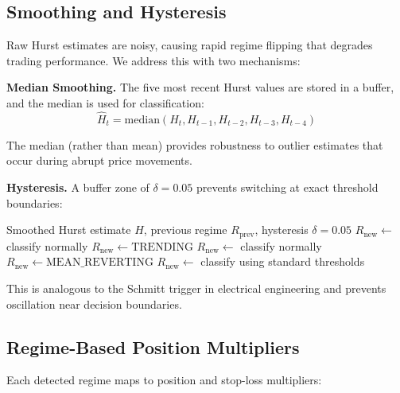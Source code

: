 \documentclass[12pt,a4paper]{article}
\begin{document}
\subsection{Smoothing and Hysteresis}
\label{sec:regime:hysteresis}

Raw Hurst estimates are noisy, causing rapid regime flipping that degrades trading performance. We address this with two mechanisms:

\textbf{Median Smoothing.} The five most recent Hurst values are stored in a buffer, and the median is used for classification:
\begin{equation}
    \hat{H}_t = \text{median}(H_{t}, H_{t-1}, H_{t-2}, H_{t-3}, H_{t-4})
\end{equation}

The median (rather than mean) provides robustness to outlier estimates that occur during abrupt price movements.

\textbf{Hysteresis.} A buffer zone of $\delta = 0.05$ prevents switching at exact threshold boundaries:

\begin{algorithm}[h!]
\caption{Hurst Regime Detection with Hysteresis}
\label{alg:hysteresis}
\begin{algorithmic}[1]
\Require Smoothed Hurst estimate $\hat{H}$, previous regime $R_{\text{prev}}$, hysteresis $\delta = 0.05$
     
        \State $R_{\text{new}} \gets$ classify normally
    \Else
        \State $R_{\text{new}} \gets \text{TRENDING}$
    \EndIf
{}
     
        \State $R_{\text{new}} \gets$ classify normally
    \Else
        \State $R_{\text{new}} \gets \text{MEAN\_REVERTING}$
    \EndIf
\Else
    \State $R_{\text{new}} \gets$ classify using standard thresholds
\EndIf
\end{algorithmic}
\end{algorithm}

This is analogous to the Schmitt trigger in electrical engineering and prevents oscillation near decision boundaries.

\subsection{Regime-Based Position Multipliers}

Each detected regime maps to position and stop-loss multipliers:
\end{document}
